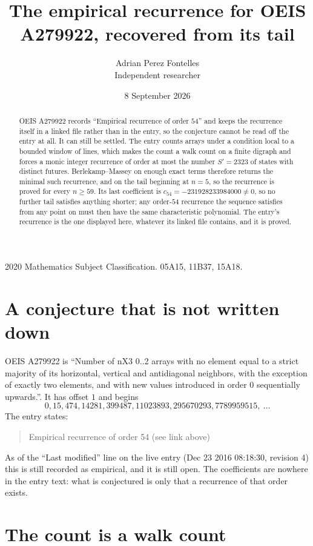 \documentclass[11pt,a4paper]{article}
\title{The empirical recurrence for OEIS A279922, recovered from its tail}
\author{Adrian Perez Fontelles\\ \small Independent researcher}
\date{8 September 2026}
\theoremstyle{plain}
\theoremstyle{definition}
\begin{document}
\maketitle

\begin{abstract}
OEIS A279922 records ``Empirical recurrence of order $54$'' and keeps the recurrence itself in
a linked file rather than in the entry, so the conjecture cannot be read off the entry at all.
It can still be settled. The entry counts arrays under a condition local to a bounded window of
lines, which makes the count a walk count on a finite digraph and forces a monic integer
recurrence of order at most the number $S'=2323$ of states with distinct futures. Berlekamp--Massey on
enough exact terms therefore returns the minimal such recurrence, and on the tail beginning at $n=5$, so the recurrence is proved for every $n\ge59$.
Its last coefficient is $c_{54}=-231928233984000\neq0$, so no further tail satisfies anything
shorter; any order-$54$ recurrence the sequence satisfies from any point on must then have
the same characteristic polynomial. The entry's recurrence is the one displayed here, whatever
its linked file contains, and it is proved.
\end{abstract}

\noindent\small 2020 Mathematics Subject Classification. 05A15, 11B37, 15A18.\normalsize

\section{A conjecture that is not written down}

OEIS A279922 is ``Number of nX3 0..2 arrays with no element equal to a strict majority of its horizontal, vertical and antidiagonal neighbors, with the exception of exactly two elements, and with new values introduced in order 0 sequentially upwards.''. It has offset $1$ and begins
\[
0, 15, 474, 14281, 399487, 11023893, 295670293, 7789959515,\ \dots
\]
The entry states:
\begin{quote}
Empirical recurrence of order 54 (see link above)
\end{quote}
As of the ``Last modified'' line on the live entry (Dec 23 2016 08:18:30, revision 4)
this is still recorded as empirical, and it is still open. The coefficients are nowhere in the
entry text: what is conjectured is only that a recurrence of that order exists.

\section{The count is a walk count}
\end{document}
